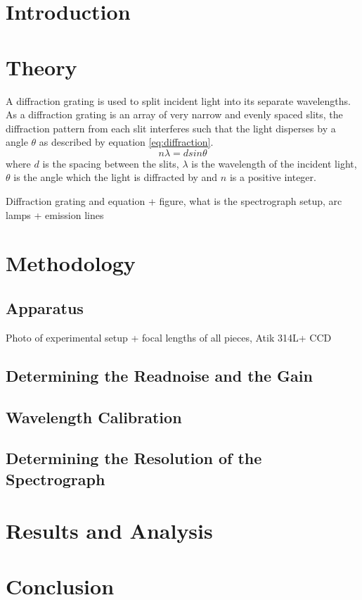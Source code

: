 \documentclass[a4paper,12pt,twocolumn]{article}
\let\cite=\supercite
\begin{document}
	\section{Introduction}
	
	\section{Theory}
		A diffraction grating is used to split incident light into its separate wavelengths. As a diffraction grating is an array of very narrow and evenly spaced slits, the diffraction pattern from each slit interferes such that the light disperses by a angle $\theta$ as described by equation \ref{eq:diffraction}\cite{hyperPhysics}.
		\begin{equation}
			n \lambda = d sin\theta
			\label{eq:diffraction}
		\end{equation} where $d$ is the spacing between the slits, $\lambda$ is the wavelength of the incident light, $\theta$ is the angle which the light is diffracted by and $n$ is a positive integer.
	
		Diffraction grating and equation + figure, what is the spectrograph setup, arc lamps + emission lines
	
	\section{Methodology}
		\subsection{Apparatus}
			Photo of experimental setup + focal lengths of all pieces, Atik 314L+ CCD
	
		\subsection{Determining the Readnoise and the Gain}
		
		\subsection{Wavelength Calibration}
	
		\subsection{Determining the Resolution of the Spectrograph}
	
	\section{Results and Analysis}
	
	\section{Conclusion}
\end{document}
